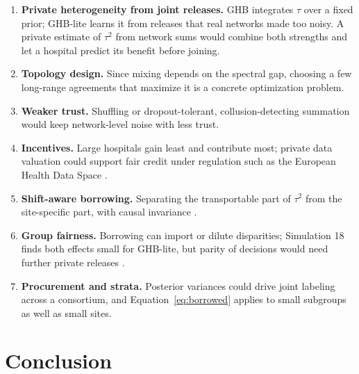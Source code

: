 \documentclass[acmsmall,screen,review]{acmart}
\theoremstyle{acmdefinition}
\begin{document}
\begin{enumerate}[leftmargin=*,itemsep=2pt]
\item \textbf{Private heterogeneity from joint releases.} GHB integrates $\tau$ over a fixed prior; GHB-lite learns it from releases that real networks made too noisy. A private estimate of $\tau^2$ from network sums would combine both strengths and let a hospital predict its benefit before joining.
\item \textbf{Topology design.} Since mixing depends on the spectral gap, choosing a few long-range agreements that maximize it is a concrete optimization problem.
\item \textbf{Weaker trust.} Shuffling \cite{erlingsson2019amplification} or dropout-tolerant, collusion-detecting summation would keep network-level noise with less trust.
\item \textbf{Incentives.} Large hospitals gain least and contribute most; private data valuation \cite{ghorbani2019data} could support fair credit under regulation such as the European Health Data Space \cite{ehds2025}.
\item \textbf{Shift-aware borrowing.} Separating the transportable part of $\tau^2$ from the site-specific part, with causal invariance \cite{arjovsky2019invariant,castro2020causality}.
\item \textbf{Group fairness.} Borrowing can import or dilute disparities; Simulation 18 finds both effects small for GHB-lite, but parity of decisions would need further private releases \cite{salazar2023fairfate}.
\item \textbf{Procurement and strata.} Posterior variances could drive joint labeling across a consortium, and Equation~\eqref{eq:borrowed} applies to small subgroups as well as small sites.
\end{enumerate}

\section{Conclusion}\label{sec:conclusion}
\end{document}
